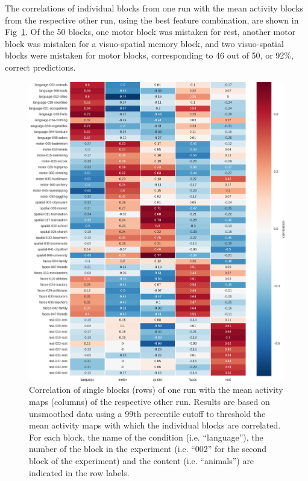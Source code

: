 \documentclass[fleqn,10pt]{SelfArx} %
\begin{document}
The correlations of individual blocks from one run with the mean activity blocks from the respective other run, using the best feature combination, are shown in Fig~\ref{fig:trainHeat}. Of the 50 blocks, one motor block was mistaken for rest, another motor block was mistaken for a visuo-spatial memory block, and two visuo-spatial blocks were mistaken for motor blocks, corresponding to 46 out of 50, or 92\%, correct predictions.

\begin{figure}[htbp]
	\begin{minipage}{\textwidth}
		\renewcommand{\familydefault}{\sfdefault}\normalfont
		\centering
		\includegraphics[width=\columnwidth]{./figs/fig4_trainHeat.png}
				\vspace*{-3mm}
		\caption{Correlation of single blocks (rows) of one run with the mean activity maps (columns) of the respective other run. Results are based on unsmoothed data using a 99th percentile cutoff to threshold the mean activity maps with which the individual blocks are correlated. For each block, the name of the condition (i.e. “language”), the number of the block in the experiment (i.e. “002” for the second block of the experiment) and the content (i.e. “animals”) are indicated in the row labels.}%
		\label{fig:trainHeat}
	\end{minipage}
\end{figure}
\end{document}
